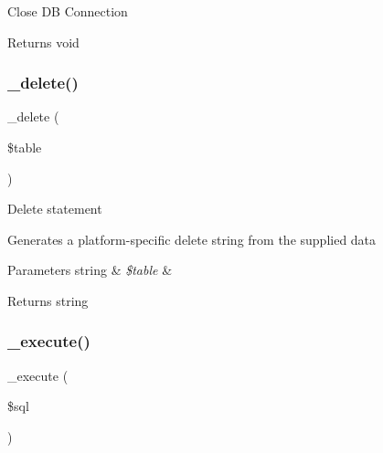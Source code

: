Close DB Connection

\begin{DoxyReturn}{Returns}
void 
\end{DoxyReturn}
\mbox{\label{class_c_i___d_b__mssql__driver_a133ea8446ded52589bd22cc9163d0896}} 
\subsubsection{\texorpdfstring{\+\_\+delete()}{\_delete()}}
{\footnotesize\ttfamily \+\_\+delete (\begin{DoxyParamCaption}\item[{}]{\$table }\end{DoxyParamCaption})\hspace{0.3cm}{\ttfamily [protected]}}

Delete statement

Generates a platform-\/specific delete string from the supplied data


\begin{DoxyParams}[1]{Parameters}
string & {\em \$table} & \\
\hline
\end{DoxyParams}
\begin{DoxyReturn}{Returns}
string 
\end{DoxyReturn}
\mbox{\label{class_c_i___d_b__mssql__driver_a114ab675d89bf8324a41785fb475e86d}} 
\subsubsection{\texorpdfstring{\+\_\+execute()}{\_execute()}}
{\footnotesize\ttfamily \+\_\+execute (\begin{DoxyParamCaption}\item[{}]{\$sql }\end{DoxyParamCaption})\hspace{0.3cm}{\ttfamily [protected]}}

